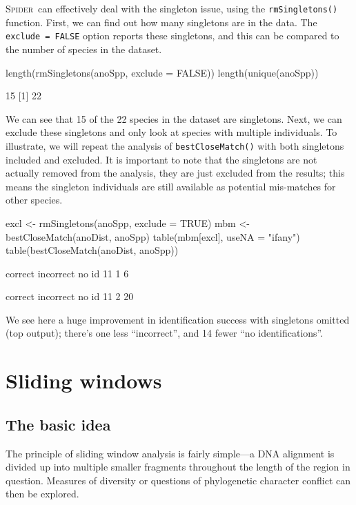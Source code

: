 \documentclass{article}
\newcommand{\Spider}{\textsc{Spider}} %
\newcommand{\fun}[1]{\texttt{#1}}
\begin{document}
\Spider~can effectively deal with the singleton issue, using the \fun{rmSingletons()} function. First, we can find out how many singletons are in the data. The \fun{exclude = FALSE} option reports these singletons, and this can be compared to the number of species in the dataset.

\begin{console}
length(rmSingletons(anoSpp, exclude = FALSE))
length(unique(anoSpp))
\end{console}


\begin{Routput}
[1] 15
[1] 22
\end{Routput}


We can see that 15 of the 22 species in the dataset are singletons. Next, we can exclude these singletons and only look at species with multiple individuals. To illustrate, we will repeat the analysis of \fun{bestCloseMatch()} with both singletons included and excluded. It is important to note that the singletons are not actually removed from the analysis, they are just excluded from the results; this means the singleton individuals are still available as potential mis-matches for other species.

\begin{console}
excl <- rmSingletons(anoSpp, exclude = TRUE)
mbm <- bestCloseMatch(anoDist, anoSpp)
table(mbm[excl], useNA = "ifany")
table(bestCloseMatch(anoDist, anoSpp))
\end{console}

\begin{Routput}
  correct incorrect     no id 
       11         1         6 

  correct incorrect     no id 
       11         2        20 
\end{Routput}

We see here a huge improvement in identification success with singletons omitted (top output); there's one less ``incorrect'', and 14 fewer ``no identifications''.



\section{Sliding windows} 

\subsection{The basic idea}
The principle of sliding window analysis is fairly simple---a DNA alignment is divided up into multiple smaller fragments throughout the length of the region in question. Measures of diversity \citep{Roe.Sper.2007} or questions of phylogenetic character conflict \citep{Crui.2011} can then be explored.
\end{document}

